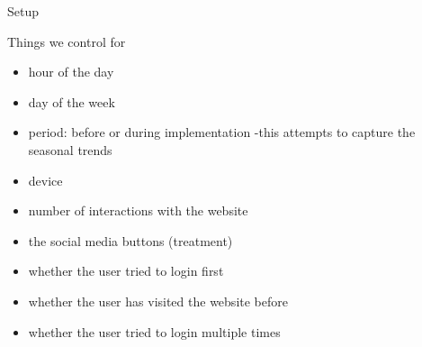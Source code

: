 \documentclass{beamer}
\begin{document}
			\begin{frame}{Setup}
				\begin{block}{Things we control for}
					\small
					\begin{itemize}
						\item hour of the day
						\item day of the week
						\item period: before or during implementation -this attempts to capture the seasonal trends
						\item device
						\item number of interactions with the website
						\item the social media buttons (treatment)
						\item whether the user tried to login first
						\item whether the user has visited the website before
						\item whether the user tried to login multiple times
					\end{itemize}
				\end{block}
				\tiny
			\end{frame}
			
\end{document}
